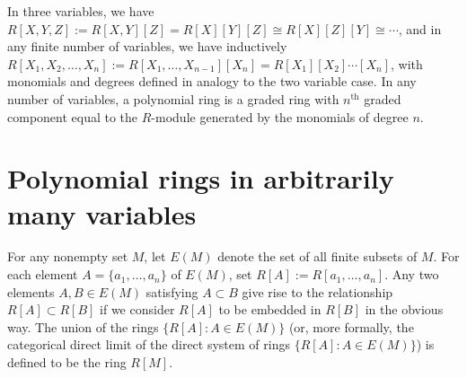 \documentclass[12pt]{article}
\begin{document}
In three variables, we have $R[X,Y,Z] := R[X,Y][Z] = R[X][Y][Z] \cong R[X][Z][Y] \cong \cdots$, and in any finite number of variables, we have inductively $R[X_1,X_2,\dots,X_n] := R[X_1,\dots,X_{n-1}][X_n] = R[X_1][X_2]\cdots[X_n]$, with monomials and degrees defined in analogy to the two variable case. In any number of variables, a polynomial ring is a graded ring with $n^\mathrm{th}$ graded component equal to the $R$-module generated by the monomials of degree $n$.

\section{Polynomial rings in arbitrarily many variables}

For any nonempty set $M$, let $E(M)$ denote the set of all finite subsets of $M$. For each element $A = \{a_1, \ldots ,a_n\}$ of $E(M)$, set $R[A]:=R[a_1,\ldots,a_n]$.  Any two elements $A,B \in E(M)$ satisfying $A \subset B$ give rise to the relationship $R[A] \subset R[B]$ if we consider $R[A]$ to be embedded in $R[B]$ in the obvious way. The union of the rings $\{R[A] : A \in E(M)\}$ (or, more formally, the categorical direct limit of the direct system of rings $\{R[A] : A \in E(M)\}$) is defined to be the ring $R[M]$.
\end{document}
